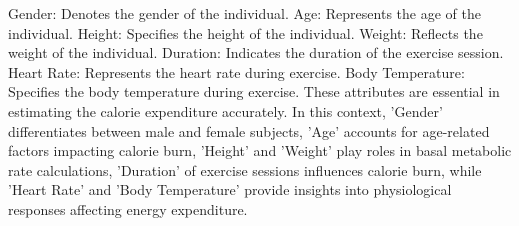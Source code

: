 \documentclass[conference]{IEEEtran}
\begin{document}
Gender: Denotes the gender of the individual.
Age: Represents the age of the individual.
Height: Specifies the height of the individual.
Weight: Reflects the weight of the individual.
Duration: Indicates the duration of the exercise session.
Heart Rate: Represents the heart rate during exercise.
Body Temperature: Specifies the body temperature during exercise.
These attributes are essential in estimating the calorie expenditure accurately. In this context, 'Gender' differentiates between male and female subjects, 'Age' accounts for age-related factors impacting calorie burn, 'Height' and 'Weight' play roles in basal metabolic rate calculations, 'Duration' of exercise sessions influences calorie burn, while 'Heart Rate' and 'Body Temperature' provide insights into physiological responses affecting energy expenditure.
\begin{table}[H]
\caption{Features of dataset 1}
\label{features}


\end{table}
\end{document}

